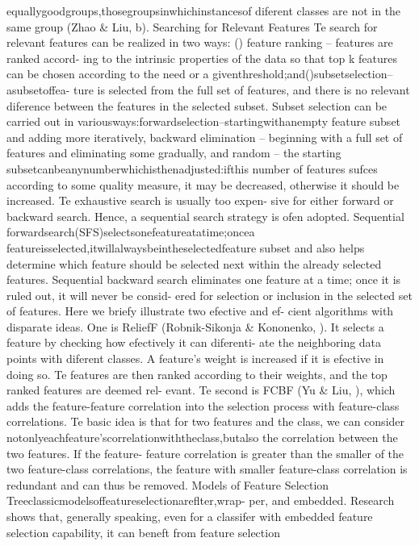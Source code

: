 equallygoodgroups,thosegroupsinwhichinstancesof
diferent classes are not in the same group (Zhao \& Liu,
b).
Searching for Relevant Features
Te search for relevant features can be realized in two
ways: () feature ranking – features are ranked accord-
ing to the intrinsic properties of the data so that top
k features can be chosen according to the need or a
giventhreshold;and()subsetselection–asubsetoffea-
ture is selected from the full set of features, and there
is no relevant diference between the features in the
selected subset. Subset selection can be carried out in
variousways:forwardselection–startingwithanempty
feature subset and adding more iteratively, backward
elimination – beginning with a full set of features and
eliminating some gradually, and random – the starting
subsetcanbeanynumberwhichisthenadjusted:ifthis
number of features sufces according to some quality
measure, it may be decreased, otherwise it should be
increased. Te exhaustive search is usually too expen-
sive for either forward or backward search. Hence, a
sequential search strategy is ofen adopted. 
Sequential
forwardsearch(SFS)selectsonefeatureatatime;oncea
featureisselected,itwillalwaysbeintheselectedfeature
subset and also helps determine which feature should
be selected next within the already selected features.
Sequential backward search eliminates one feature at
a time; once it is ruled out, it will never be consid-
ered for selection or inclusion in the selected set of
features.
Here we briefy illustrate two efective and ef-
cient algorithms with disparate ideas. 
One is ReliefF
(Robnik-Sikonja \& Kononenko, ). 
It selects a
feature by checking how efectively it can diferenti-
ate the neighboring data points with diferent classes.
A feature’s weight is increased if it is efective in doing
so. 
Te features are then ranked according to their
weights, and the top ranked features are deemed rel-
evant. 
Te second is FCBF (Yu \& Liu, ), which
adds the feature-feature correlation into the selection
process with feature-class correlations. 
Te basic idea
is that for two features and the class, we can consider
notonlyeachfeature’scorrelationwiththeclass,butalso
the correlation between the two features. 
If the feature-
feature correlation is greater than the smaller of the
two feature-class correlations, the feature with smaller
feature-class correlation is redundant and can thus be
removed.
Models of Feature Selection
Treeclassicmodelsoffeatureselectionareflter,wrap-
per, and embedded. 
Research shows that, generally
speaking, even for a classifer with embedded feature
selection capability, it can beneft from feature selection
